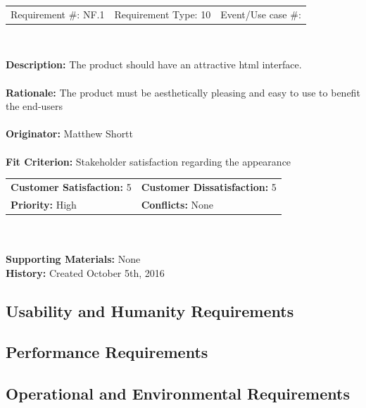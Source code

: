 \documentclass[12pt, titlepage]{article}
\begin{document}
\begin{framed}

	\begin{center}
		
		\begin{tabular}{ l c r }
			Requirement \#: NF.1 & Requirement Type: 10 & Event/Use case \#: \\
		\end{tabular} \\
	\end{center}
	\textbf{Description:} The product should have an attractive html interface. \\
	\\
	\textbf{Rationale:} The product must be aesthetically pleasing and easy to 
	use to benefit the end-users \\
	\\
	\textbf{Originator:} Matthew Shortt \\
	\\
	\textbf{Fit Criterion:} Stakeholder satisfaction regarding the appearance  \\

	\begin{tabular}{ll}
		\textbf{Customer Satisfaction:} 5 & \textbf{Customer Dissatisfaction:} 5 \\
		\textbf{Priority:} High & \textbf{Conflicts:} None\\
	\end{tabular} \\
	\\
	\textbf{Supporting Materials:} None \\
	\textbf{History:} Created October 5th, 2016

\end{framed}





\subsection{Usability and Humanity Requirements}

\subsection{Performance Requirements}

\subsection{Operational and Environmental Requirements}
\end{document}
